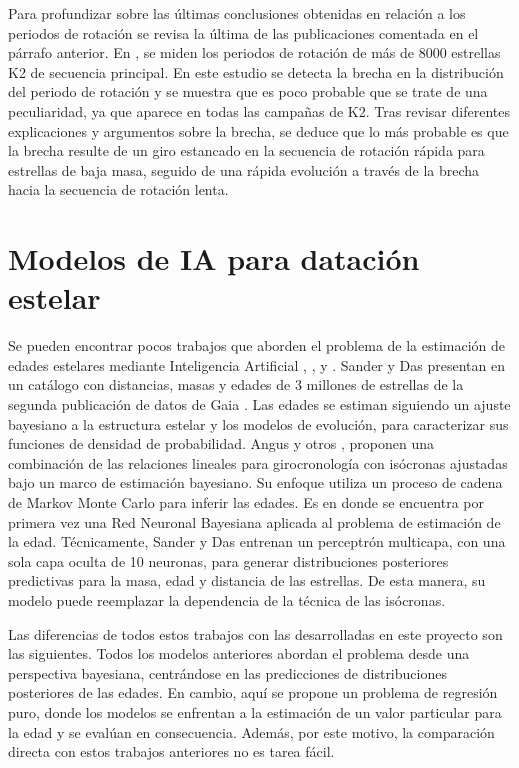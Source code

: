 Para profundizar sobre las últimas conclusiones obtenidas en relación a los periodos de rotación se revisa la última de las publicaciones comentada en el párrafo anterior. En \cite{Gordon21}, se miden los periodos de rotación de más de 8000 estrellas K2 de secuencia principal. En este estudio se detecta la brecha en la distribución del periodo de rotación y se muestra que es poco probable que se trate de una peculiaridad, ya que aparece en todas las campañas de K2. Tras revisar diferentes explicaciones y argumentos sobre la brecha, se deduce que lo más probable es que la brecha resulte de un giro estancado en la secuencia de rotación rápida para estrellas de baja masa, seguido de una rápida evolución a través de la brecha hacia la secuencia de rotación lenta.


\section{Modelos de IA para datación estelar}
Se pueden encontrar pocos trabajos que aborden el problema de la estimación de edades estelares mediante Inteligencia Artificial \cite{stardate}, \cite{Angus19}, \cite{das2018} y \cite{sanders2018}. Sander y Das presentan en \cite{sanders2018} un catálogo con distancias, masas y edades de 3 millones de estrellas de la segunda publicación de datos de Gaia \cite{Gaia2018}. %
Las edades se estiman siguiendo un ajuste bayesiano a la estructura estelar y los modelos de evolución, para caracterizar sus funciones de densidad de probabilidad. Angus y otros \cite{stardate}, \cite{Angus19} proponen una combinación de las relaciones lineales para girocronología con isócronas ajustadas bajo un marco de estimación bayesiano. Su enfoque utiliza un proceso de cadena de Markov Monte Carlo para inferir las edades. Es en \cite{sanders2018} donde se encuentra por primera vez una Red Neuronal Bayesiana aplicada al problema de estimación de la edad. Técnicamente, Sander y Das \cite{sanders2018} entrenan un perceptrón multicapa, con una sola capa oculta de 10 neuronas, para generar distribuciones posteriores predictivas para la masa, edad y distancia de las estrellas. De esta manera, su modelo puede reemplazar la dependencia de la técnica de las isócronas. 

Las diferencias de todos estos trabajos con las desarrolladas en este proyecto son las siguientes. Todos los modelos anteriores abordan el problema desde una perspectiva bayesiana, centrándose en las predicciones de distribuciones posteriores de las edades. En cambio, aquí se propone un problema de regresión puro, donde los modelos se enfrentan a la estimación de un valor particular para la edad y se evalúan en consecuencia. Además, por este motivo, la comparación directa con estos trabajos anteriores no es tarea fácil.

